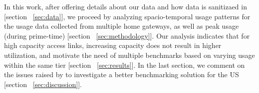 In this work, after offering details about our data and how data is sanitizaed in [section
~\ref{sec:data}], we proceed by analyzing spacio-temporal usage patterns for the usage data
collected from multiple home gateways, as well as peak usage (during prime-time) [section
~\ref{sec:methodology}]. Our analysis indicates that for high capacity access links, increasing
capacity does not result in higher utilization, and motivate the need of multiple benchmarks based
on varying usage within the same tier [section ~\ref{sec:results}]. In the last section, we comment
on the issues raised by \FCC to investigate a better benchmarking solution for the US [section
~\ref{sec:discussion}].


